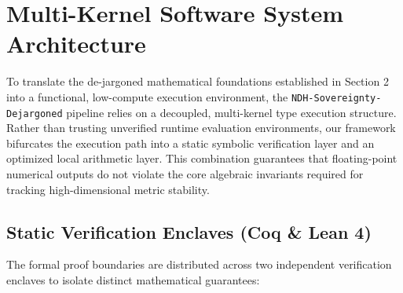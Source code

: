 
\section{Multi-Kernel Software System Architecture}

To translate the de-jargoned mathematical foundations established in Section 2 into a functional, low-compute execution environment, the \texttt{NDH-Sovereignty-Dejargoned} pipeline relies on a decoupled, multi-kernel type execution structure. Rather than trusting unverified runtime evaluation environments, our framework bifurcates the execution path into a static symbolic verification layer and an optimized local arithmetic layer. This combination guarantees that floating-point numerical outputs do not violate the core algebraic invariants required for tracking high-dimensional metric stability.

\subsection{Static Verification Enclaves (Coq \& Lean 4)}

The formal proof boundaries are distributed across two independent verification enclaves to isolate distinct mathematical guarantees:

